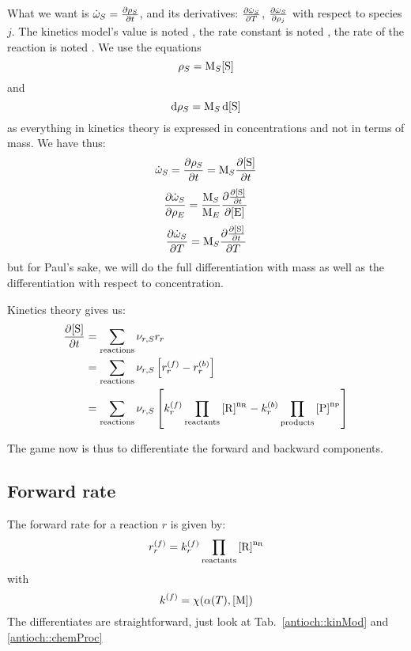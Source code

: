 What we want is 
$\mdot[S] = \doverdt{\mass[S]}$, and its derivatives:
$\doverdT{\mdot[S]}$, $\doverdm[j]{\mdot[S]}$ with respect to species $j$.
%
The kinetics model's value is noted \kinMod, the rate constant is noted \rateCons, the
rate of the reaction is noted \rate.
%
We use the equations
\begin{equation}
\mass[S] = \Mm[S] \conc[S]
\end{equation}
and
\begin{equation}
\dd\mass[S] = \Mm[S]\,\dd\conc[S]
\end{equation}
as everything in kinetics theory is expressed in concentrations and 
not in terms of mass.
We have thus:
\begin{equation}
\mdot[S] = \doverdt{\mass[S]} = \Mm[S] \doverdt{\conc[S]}
\end{equation}
\begin{equation}
\doverdm[E]{\mdot[S]} = \frac{\Mm[S]}{\Mm[E]}\doverdc[E]{\doverdt{\conc[S]}}
\label{derive:m_T}
\end{equation}
\begin{equation}
\doverdT{\mdot[S]} = \Mm[S]\doverdT{\doverdt{\conc[S]}}
\label{derive:m_c}
\end{equation}
but for Paul's sake, we will do the full differentiation with mass as well
as the differentiation with respect to concentration.

Kinetics theory gives us:
\begin{equation}
\begin{split}
\doverdt{\conc[S]} & = \sum_{\text{reactions}} \scoef[r,S] \rate[r] \\
                   & = \sum_{\text{reactions}} \scoef[r,S] \left[\fwdrate[r] - \bkwdrate[r]\right]\\
                   & = \sum_{\text{reactions}} \scoef[r,S]
                        \left[ \fwdratecons[r] \prodReac - \bkwdratecons[r] \prodProd \right]
\end{split}
\label{phys:kinetics_theory_integrated}
\end{equation}

The game now is thus to differentiate the forward and backward components.
\subsection{Forward rate}

The forward rate \fwdrate[r] for a reaction $r$ is given by:
\begin{equation}
\fwdrate[r] = \fwdratecons[r] \prodReac
\label{ratefDef}
\end{equation}
with
\begin{equation}
\fwdratecons = \chemProc
\end{equation}
The differentiates are straightforward, just look at Tab.~\ref{antioch::kinMod}
and \ref{antioch::chemProc}

